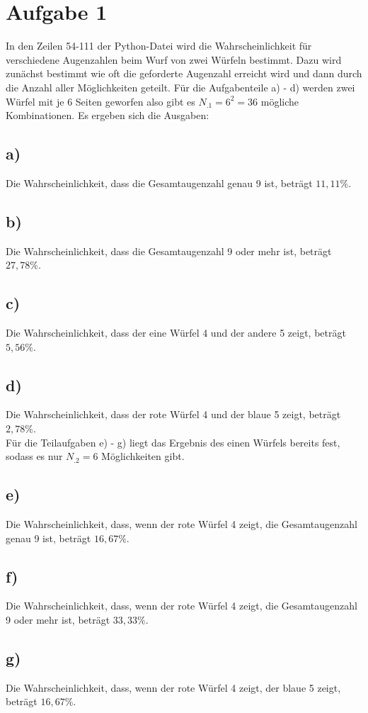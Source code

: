 \section{Aufgabe 1}
\label{sec:Aufgabe1}
In den Zeilen 54-111 der Python-Datei wird die Wahrscheinlichkeit für verschiedene Augenzahlen beim Wurf von zwei Würfeln bestimmt. Dazu wird zunächst bestimmt wie oft die geforderte Augenzahl erreicht wird und dann durch die Anzahl aller Möglichkeiten geteilt.
Für die Aufgabenteile a) - d) werden zwei Würfel mit je 6 Seiten geworfen
also gibt es $N_.1=6^2=36$ mögliche Kombinationen.
Es ergeben sich die Ausgaben:

\subsection*{a)}

Die Wahrscheinlichkeit, dass die Gesamtaugenzahl genau 9 ist, beträgt $11,11\%$.

\subsection*{b)}

Die Wahrscheinlichkeit, dass die Gesamtaugenzahl 9 oder mehr ist, beträgt $27,78\%$.

\subsection*{c)}

Die Wahrscheinlichkeit, dass der eine Würfel 4 und der andere 5 zeigt, beträgt $5,56\%$.

\subsection*{d)}

Die Wahrscheinlichkeit, dass der rote Würfel 4 und der blaue 5 zeigt, beträgt $2,78\%$.\\

\noindent Für die Teilaufgaben e) - g) liegt das Ergebnis des einen Würfels bereits fest, sodass es nur $N_.2=6$ Möglichkeiten gibt.

\subsection*{e)}

Die Wahrscheinlichkeit, dass, wenn der rote Würfel 4 zeigt, die Gesamtaugenzahl genau 9 ist, beträgt $16,67\%$.

\subsection*{f)}

Die Wahrscheinlichkeit, dass, wenn der rote Würfel 4 zeigt, die Gesamtaugenzahl 9 oder mehr ist, beträgt $33,33\%$.

\subsection*{g)}

Die Wahrscheinlichkeit, dass, wenn der rote Würfel 4 zeigt, der blaue 5 zeigt, beträgt $16,67\%$.
